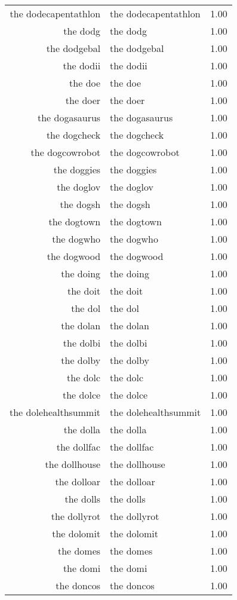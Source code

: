 \begin{table}[ht]
\begin{tabular}{rlr}
  the dodecapentathlon & the dodecapentathlon & 1.00 \\ 
  the dodg & the dodg & 1.00 \\ 
  the dodgebal & the dodgebal & 1.00 \\ 
  the dodii & the dodii & 1.00 \\ 
  the doe & the doe & 1.00 \\ 
  the doer & the doer & 1.00 \\ 
  the dogasaurus & the dogasaurus & 1.00 \\ 
  the dogcheck & the dogcheck & 1.00 \\ 
  the dogcowrobot & the dogcowrobot & 1.00 \\ 
  the doggies & the doggies & 1.00 \\ 
  the doglov & the doglov & 1.00 \\ 
  the dogsh & the dogsh & 1.00 \\ 
  the dogtown & the dogtown & 1.00 \\ 
  the dogwho & the dogwho & 1.00 \\ 
  the dogwood & the dogwood & 1.00 \\ 
  the doing & the doing & 1.00 \\ 
  the doit & the doit & 1.00 \\ 
  the dol & the dol & 1.00 \\ 
  the dolan & the dolan & 1.00 \\ 
  the dolbi & the dolbi & 1.00 \\ 
  the dolby & the dolby & 1.00 \\ 
  the dolc & the dolc & 1.00 \\ 
  the dolce & the dolce & 1.00 \\ 
  the dolehealthsummit & the dolehealthsummit & 1.00 \\ 
  the dolla & the dolla & 1.00 \\ 
  the dollfac & the dollfac & 1.00 \\ 
  the dollhouse & the dollhouse & 1.00 \\ 
  the dolloar & the dolloar & 1.00 \\ 
  the dolls & the dolls & 1.00 \\ 
  the dollyrot & the dollyrot & 1.00 \\ 
  the dolomit & the dolomit & 1.00 \\ 
  the domes & the domes & 1.00 \\ 
  the domi & the domi & 1.00 \\ 
  the doncos & the doncos & 1.00 \\ 

\end{tabular}
\end{table}
